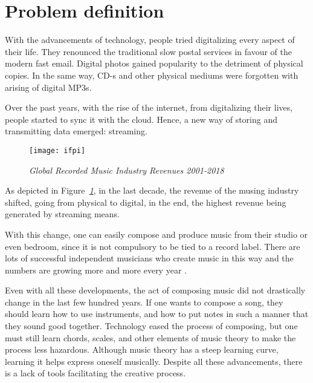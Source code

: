 \section{Problem definition}
With the advancements of technology,
people tried digitalizing every aspect of their life.
They renounced the traditional slow postal services in favour of
the modern fast email.
Digital photos gained popularity to the detriment of physical copies.
In the same way, CD-s and other physical mediums were
forgotten with arising of digital MP3s.

Over the past years, with the rise of the internet,
from digitalizing their lives, people started to sync
it with the cloud. Hence, a new way of storing and
transmitting data emerged: streaming.

\begin{figure}[h]
    \centering
    \texttt{[image: ifpi]}
    \caption{\emph{Global Recorded Music Industry Revenues 2001-2018  \cite{ifpi}}}
    \label{fig:ifpi}
\end{figure}

As depicted in  Figure\emph{~\ref{fig:ifpi}}, in the last decade,
the revenue of the musing industry shifted,
going from physical to digital, in the end,
the highest revenue being generated by streaming means.

With this change, one can easily compose and produce
music from their studio or even bedroom,
since it is not compulsory to be tied to a record label.
There are lots of successful independent musicians who
create music in this way and the numbers are growing more
and more every year \cite{forbes}.

Even with all these developments,
the act of composing music did not drastically change in the last
few hundred years. If one wants to compose a song,
they should learn how to use instruments,
and how to put notes in such a manner that they sound good together.
Technology eased the process of composing,
but one must still learn chords, scales,
and other elements of music theory to make the process less hazardous.
Although music theory has a steep learning curve,
learning it helps express oneself musically.
Despite all these advancements,
there is a lack of tools facilitating the creative process.